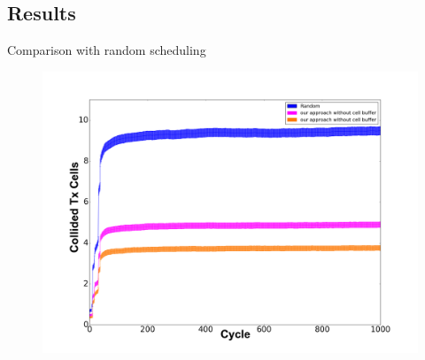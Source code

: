 \subsection{ Results}
\addtocounter{framenumber}{-1}
\begin{withoutheadline}
\begin{frame}{Comparison with random scheduling}

\begin{figure}[p]

\includegraphics[width=\linewidth]{figures/graph1.png}

\end{figure}



\end{frame}
\end{withoutheadline}

